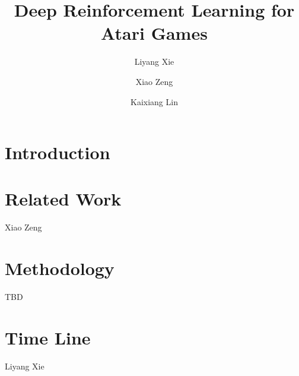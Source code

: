 \documentclass[10pt,twocolumn,letterpaper]{article}
\begin{document}
\title{Deep Reinforcement Learning for Atari Games}

\author{Liyang Xie \and Xiao Zeng \and Kaixiang Lin\\}

\maketitle


\begin{abstract}

\end{abstract}

\section{Introduction}




\section{Related Work}
Xiao Zeng





\section{Methodology}
TBD




\section{Time Line}
Liyang Xie






{\small


}
\end{document}
